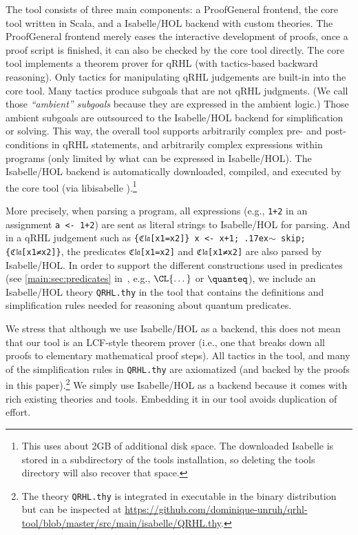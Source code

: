 \documentclass{article}
\newcommand\mytilde{\raise.17ex\hbox{$\scriptstyle\sim$}}
\newcommand\qrhlautoref[1]{\autoref{main:#1} in~\cite{qrhl-paper-from-manual}}
\begin{document}
The tool consists of three main components: a ProofGeneral
\cite{proofgeneral} frontend, the core tool written in Scala, and a
Isabelle/HOL \cite{isabelle} backend with custom theories. The
ProofGeneral frontend merely eases the interactive development of
proofs, once a proof script is finished, it can also be checked by the
core tool directly. The core tool implements a theorem prover for qRHL
(with tactics-based backward reasoning). Only tactics for manipulating
qRHL judgements are built-in into the core tool. Many tactics produce
subgoals that are not qRHL judgments.
(We call those \emph{``ambient'' subgoals}%
 because they are expressed in the ambient logic.)
Those ambient subgoals are outsourced to
the Isabelle/HOL backend for simplification or solving. This way, the
overall tool supports arbitrarily complex pre- and post-conditions in
qRHL statements, and arbitrarily complex expressions within programs
(only limited by what can be expressed in Isabelle/HOL). The
Isabelle/HOL backend is automatically downloaded, compiled, and
executed by the core tool (via libisabelle \cite{libisabelle}).\footnote{This
  uses about 2GB of additional disk space.
  The downloaded Isabelle is stored in a subdirectory of the tools installation,
  so deleting the tools directory will also recover that space.}
  

More precisely, when parsing a program, all expressions (e.g.,
\texttt{1+2} in an assignment \texttt{a <- 1+2}) are sent as literal
strings to Isabelle/HOL for parsing. And in a qRHL judgement such as
\texttt{\{ℭ𝔩𝔞[x1=x2]\} x <- x+1; \mytilde{} skip; \{ℭ𝔩𝔞[x1≠x2]\}}, the
predicates \texttt{ℭ𝔩𝔞[x1=x2]} and \texttt{ℭ𝔩𝔞[x1≠x2]} are also parsed
by Isabelle/HOL. In order to support the different constructions used
in predicates (see \qrhlautoref{sec:predicates}, e.g., $\CL{\dots}$
or $\quanteq$),
we include an Isabelle/HOL theory \texttt{QRHL.thy} in the tool that
contains the definitions and simplification rules needed for reasoning
about quantum predicates.

We stress that although we use Isabelle/HOL as a backend, this does
not mean that our tool is an LCF-style theorem prover (i.e., one that
breaks down all proofs to elementary mathematical proof steps).  All
tactics in the tool, and many of the simplification rules in
\texttt{QRHL.thy} are axiomatized (and backed by the proofs in this
paper).\footnote{The theory \texttt{QRHL.thy} is integrated in executable in the binary distribution
  but can be inspected 
  at \url{https://github.com/dominique-unruh/qrhl-tool/blob/master/src/main/isabelle/QRHL.thy}.}
We simply use Isabelle/HOL as a backend because it comes with
rich existing theories and tools. Embedding it in our tool avoids
duplication of effort.
\end{document}

